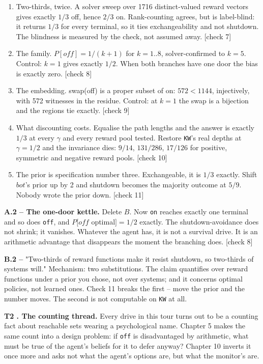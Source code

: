 \begin{enumerate}
\item Two-thirds, twice. A solver sweep over 1716 distinct-valued reward vectors gives exactly $1/3$ off, hence $2/3$ on. Rank-counting agrees, but is label-blind: it returns $1/3$ for every terminal, so it ties exchangeability and not shutdown. The blindness is measured by the check, not assumed away. [check 7]
\item The family. $P[off] = 1/(k+1)$ for $k = 1..8$, solver-confirmed to $k = 5$. Control: $k = 1$ gives exactly $1/2$. When both branches have one door the bias is exactly zero. [check 8]
\item The embedding. swap(off) is a proper subset of on: $572 < 1144$, injectively, with 572 witnesses in the residue. Control: at $k = 1$ the swap is a bijection and the regions tie exactly. [check 9]
\item What discounting costs. Equalise the path lengths and the answer is exactly $1/3$ at every $\gamma$ and every reward pool tested. Restore \texttt{KW}'s real depths at $\gamma = 1/2$ and the invariance dies: $9/14$, $131/286$, $17/126$ for positive, symmetric and negative reward pools. [check 10]
\item The prior is specification number three. Exchangeable, it is $1/3$ exactly. Shift $bot$'s prior up by 2 and shutdown becomes the majority outcome at $5/9$. Nobody wrote the prior down. [check 11]
\end{enumerate}


\textbf{A.2 -- The one-door kettle.} Delete $B$. Now \texttt{on} reaches exactly one terminal and so does \texttt{off}, and $P[off$ optimal$] = 1/2$ exactly. The shutdown-avoidance does not shrink; it vanishes. Whatever the agent has, it is not a survival drive. It is an arithmetic advantage that disappears the moment the branching does. [check 8]

\textbf{B.2 --} "Two-thirds of reward functions make it resist shutdown, so two-thirds of systems will." Mechanism: two substitutions. The claim quantifies over reward functions under a prior you chose, not over systems; and it concerns optimal policies, not learned ones. Check 11 breaks the first -- move the prior and the number moves. The second is not computable on \texttt{KW} at all.

\textbf{T2 . The counting thread.} Every drive in this tour turns out to be a counting fact about reachable sets wearing a psychological name. Chapter 5 makes the same count into a design problem: if \texttt{off} is disadvantaged by arithmetic, what must be true of the agent's beliefs for it to defer anyway? Chapter 10 inverts it once more and asks not what the agent's options are, but what the monitor's are.

